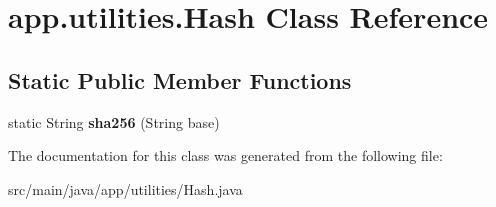 \hypertarget{classapp_1_1utilities_1_1_hash}{}\section{app.\+utilities.\+Hash Class Reference}
\label{classapp_1_1utilities_1_1_hash}
\subsection*{Static Public Member Functions}
\begin{DoxyCompactItemize}
\item 
\mbox{\label{classapp_1_1utilities_1_1_hash_a948a0a38cc5e350d81665060b9dc3c1e}} 
static String {\bfseries sha256} (String base)
\end{DoxyCompactItemize}


The documentation for this class was generated from the following file\+:\begin{DoxyCompactItemize}
\item 
src/main/java/app/utilities/Hash.\+java\end{DoxyCompactItemize}
